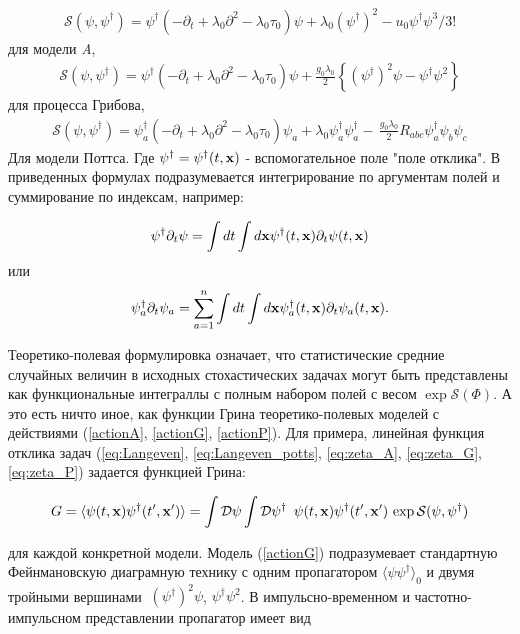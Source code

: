 \documentclass []{rusthesis} %
\def\D{{\mathcal D}}
\def\S{{\mathcal S}}
\begin{document}
\begin{eqnarray}
\S(\psi,\psi^{\dagger}) =  \psi^{\dagger}
\left(-\partial_{t}+\lambda_{0} \partial^{2}- \lambda_{0}\tau_{0}\right)
\psi + \lambda_{0} (\psi^{\dagger})^2 - u_{0} \psi^{\dagger}\psi^3/3!
\label{actionA}
\end{eqnarray}
для модели {\it A},
\begin{eqnarray}
\S(\psi,\psi^{\dag}) =  \psi^{\dag}
(-\partial_{t}+\lambda_{0} \partial^{2}- \lambda_{0}\tau_{0}) \psi
+ \frac{g_{0}\lambda_{0}}{2} \left\{ (\psi^{\dagger})^2\psi -
\psi^{\dagger}\psi^2  \right\}
\label{actionG}
\end{eqnarray}
для процесса Грибова,
\begin{eqnarray}
\S(\psi,\psi^{\dagger}) =  \psi^{\dagger}_a
\left(-\partial_{t}+\lambda_{0} \partial^{2}- \lambda_{0}\tau_{0}\right)
\psi_a + \lambda_{0} \psi_a^{\dagger} \psi_a^{\dagger}-\,
\frac{g_{0}\lambda_0}{2} R_{abc}\psi_a^{\dagger}\psi_b\psi_c
\label{actionP}
\end{eqnarray}
Для модели Поттса. Где $\psi^{\dag}=\psi^{\dag}(t,{\bf x})$ - вспомогательное поле "поле отклика".
В приведенных формулах подразумевается интегрирование по аргументам полей и суммирование по индексам, например:

\[  \psi^{\dag}\partial_{t}\psi = \int dt \int d{\bf x}
\psi^{\dag}(t,{\bf x})\partial_{t}\psi(t,{\bf x}) \]
или
\[  \psi_a^{\dag}\partial_{t}\psi_a = \sum_{a=1}^{n}\int dt \int d{\bf x}
\psi_a^{\dag}(t,{\bf x})\partial_{t}\psi_a(t,{\bf x}). \]

Теоретико-полевая формулировка означает, что статистические средние случайных величин
в исходных стохастических задачах могут быть представлены как функциональные интеграллы
с полным набором полей с весом $\exp {\S}(\Phi)$. А это есть ничто иное, как функции Грина
теоретико-полевых моделей с действиями (\ref{actionA}, \ref{actionG}, \ref{actionP}). Для примера,
линейная функция отклика задач (\ref{eq:Langeven}, \ref{eq:Langeven_potts}, \ref{eq:zeta_A}, \ref{eq:zeta_G}, \ref{eq:zeta_P}) 
задается функцией Грина:

\begin{eqnarray}
G=\langle \psi(t, {\bf x}) \psi^{\dag}(t', {\bf x'} ) \rangle =
\int {\D}\psi \int {\D} \psi^{\dag}\ \,
\psi(t, {\bf x}) \psi^{\dag}(t', {\bf x'})\, \exp {\S}(\psi,\psi^{\dag})
\label{respd}
\end{eqnarray}

для каждой конкретной модели. Модель (\ref{actionG}) подразумевает стандартную Фейнмановскую
диаграмную технику с одним пропагатором $\langle\psi \psi^{\dag}\rangle_0$ и двумя тройными вершинами
$ ~ (\psi^{\dag})^2 \psi$, $\psi^{\dag} \psi^2$. В импульсно-временном и частотно-импульсном представлении
пропагатор имеет вид
\end{document}
